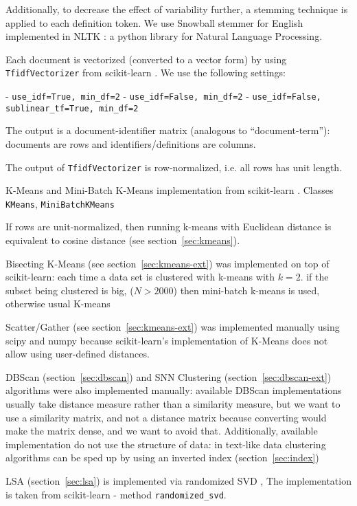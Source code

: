 Additionally, to decrease the effect of variability further, 
a stemming technique is applied to each definition token. 
We use Snowball stemmer for English \cite{porter2001snowball} 
implemented in NLTK \cite{bird2006nltk}: 
a python library for Natural Language Processing. 

Each document is vectorized (converted to a vector form) by using
\verb|TfidfVectorizer| from  scikit-learn \cite{scikit-learn}. 
We use the following settings: 

- \verb|use_idf=True, min_df=2|
- \verb|use_idf=False, min_df=2|
- \verb|use_idf=False, sublinear_tf=True, min_df=2|

The output is a document-identifier matrix (analogous to ``document-term''):
documents are rows and identifiers/definitions are columns. 

The output of \verb|TfidfVectorizer| is row-normalized, i.e. 
all rows has unit length. 


K-Means and Mini-Batch K-Means implementation from scikit-learn \cite{scikit-learn}.
Classes \verb|KMeans|, \verb|MiniBatchKMeans|

If rows are unit-normalized, then running k-means with Euclidean distance
is equivalent to cosine distance (see section~\ref{sec:kmeans}).

Bisecting K-Means (see section~\ref{sec:kmeans-ext}) was implemented on top of scikit-learn: each time a data set is clustered
with k-means with $k = 2$. if the subset being clustered is big, 
($N > 2000$) then mini-batch k-means is used, otherwise usual K-means

Scatter/Gather (see section~\ref{sec:kmeans-ext}) was implemented manually 
using scipy \cite{scipy} and numpy \cite{walt2011numpy} because 
scikit-learn's implementation of K-Means does not allow using user-defined distances. 


DBScan (section~\ref{sec:dbscan}) and SNN Clustering (section~\ref{sec:dbscan-ext})
algorithms were also implemented manually:
available DBScan implementations usually take distance measure rather than 
a similarity measure, but we want to use a similarity matrix, and not 
a distance matrix because converting would make the matrix dense, 
and we want to avoid that. Additionally, available implementation
do not use the structure of data: in text-like data clustering algorithms 
can be sped up by using an inverted index (section~\ref{sec:index})


LSA (section~\ref{sec:lsa}) is implemented via randomized SVD \cite{tropp2009finding},
The implementation is taken from scikit-learn \cite{scikit-learn} - 
method \verb|randomized_svd|.


